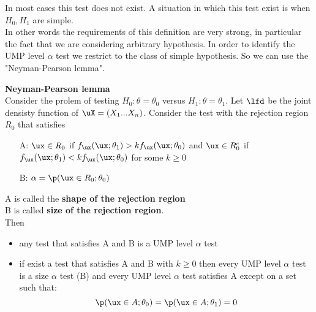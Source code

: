 In most cases this test does not exist. A situation in which this test exist is when $H_0, H_1$ are simple.\\
In other words the requirements of this definition are very strong, in particular the fact that we are considering arbitrary hypothesis. In order to identify the UMP level $\alpha$ test we restrict to the class of simple hypothesis. So we can use the "Neyman-Pearson lemma".
\begin{teo}\label{teo:NP} \textbf{Neyman-Pearson lemma}\\
	Consider the prolem of testing $H_0: \theta=\theta_0$ versus $H_1:\theta =\theta_1$. Let $\lfd$ be the joint densisty function of $\uX=(X_1...X_n)$. Consider the test with the rejection region $R_0$ that satisfies
	\begin{itemize}
		\item[A:]$\ux \in R_0$ if $f_{\ux}(\ux;\theta_1) > k f_{\ux}(\ux;\theta_0)$ and $\ux \in R_0^c$ if $ f_{\ux}(\ux;\theta_1)< k f_{\ux}(\ux;\theta_0)$ for some $k \geq 0$
		\item[B:]$\alpha=\p(\ux\in R_0; \theta_0)$
	\end{itemize}
A is called the \textbf{shape of the rejection region}\\
B is called \textbf{size of the rejection region}.\\
Then
\begin{itemize}
	\item any test that satisfies A and B is a UMP level $\alpha$ test
	\item if exist a test that satisfies A and B with $k\geq 0$ then every UMP level $\alpha$ test is a size $\alpha$ test (B) and every UMP level $\alpha$ test satisfies A except on a set such that:
	$$\p(\ux \in A;\theta_0)=\p(\ux\in A; \theta_1)=0$$ 
\end{itemize}
\end{teo}  

